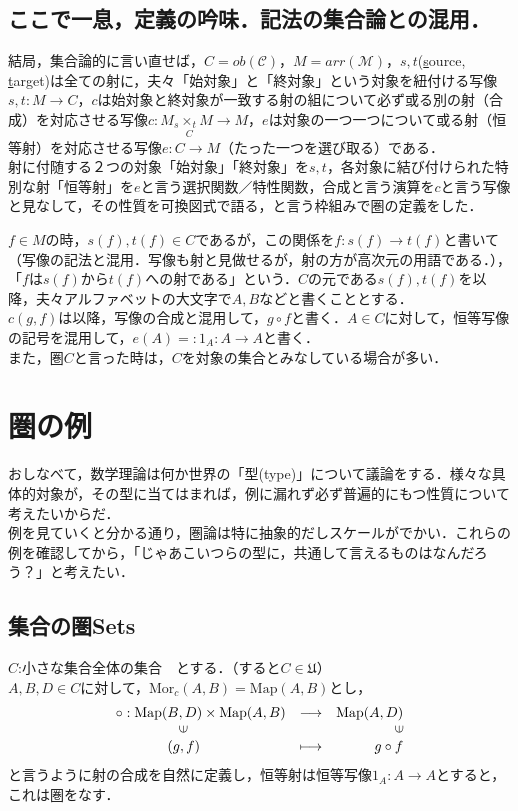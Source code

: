 \documentclass[uplatex, 12pt, a4paper, dvipdfmx]{jsarticle}
\begin{document}
\subsection{ここで一息，定義の吟味．記法の集合論との混用．}

結局，集合論的に言い直せば，$C=ob(\mathcal{C})$，$M=arr(\mathcal{M})$，$s,t$(\underline{s}ource, \underline{t}arget)は全ての射に，夫々「始対象」と「終対象」という対象を紐付ける写像$s,t:M\longrightarrow C$，$c$は始対象と終対象が一致する射の組について必ず或る別の射（合成）を対応させる写像$c:M_s \underset{C}{\times_t}M \longrightarrow M$，$e$は対象の一つ一つについて或る射（恒等射）を対応させる写像$e:C\longrightarrow M$（たった一つを選び取る）である．\\
射に付随する２つの対象「始対象」「終対象」を$s,t$，各対象に結び付けられた特別な射「恒等射」を$e$と言う選択関数／特性関数，合成と言う演算を$c$と言う写像と見なして，その性質を可換図式で語る，と言う枠組みで圏の定義をした．

$f\in M$の時，$s(f), t(f)\in C$であるが，この関係を$f:s(f)\longrightarrow t(f)$と書いて（写像の記法と混用．写像も射と見做せるが，射の方が高次元の用語である．），「$f$は$s(f)$から$t(f)$への射である」という．$C$の元である$s(f),t(f)$を以降，夫々アルファベットの大文字で$A,B$などと書くこととする．\\
$c(g,f)$は以降，写像の合成と混用して，$g\circ f$と書く．$A\in C$に対して，恒等写像の記号を混用して，$e(A)=:1_A : A\longrightarrow A$と書く．\\
また，圏$C$と言った時は，$C$を対象の集合とみなしている場合が多い．

\clearpage
\section{圏の例}
おしなべて，数学理論は何か世界の「型(type)」について議論をする．様々な具体的対象が，その型に当てはまれば，例に漏れず必ず普遍的にもつ性質について考えたいからだ．\\
例を見ていくと分かる通り，圏論は特に抽象的だしスケールがでかい．これらの例を確認してから，「じゃあこいつらの型に，共通して言えるものはなんだろう？」と考えたい．

\subsection{集合の圏\bf{Sets}}

$C$:小さな集合全体の集合　とする．（すると$C\in\mathfrak{U}$）\\
$A,B,D\in C$に対して，$\mathrm{Mor}_c(A,B)=\mathrm{Map}(A,B)$とし，$$\begin{array}{lcr}\circ : \mathrm{Map}(B,D)\times\mathrm{Map}(A,B)&\longrightarrow&\mathrm{Map}(A,D)\\ \hspace{16mm}\rotatebox{90}{$\in$} & & \rotatebox{90}{$\in$}\\ \hspace{13mm}(g,f) & \longmapsto & g\circ f \end{array}$$
と言うように射の合成を自然に定義し，恒等射は恒等写像$1_A:A\longrightarrow A$とすると，これは圏をなす．
\end{document}
